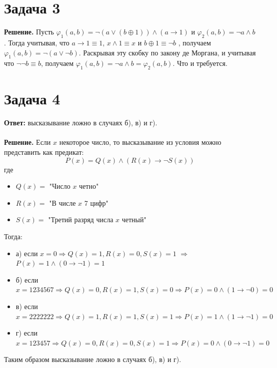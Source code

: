 \documentclass{article}
\begin{document}
\section*{Задача 3}
{\bf Решение.} Пусть $\varphi_1(a, b) = \neg (a\vee (b \oplus 1))\wedge (a \rightarrow 1)$ и $\varphi_2(a, b) = \neg a \wedge b$. Тогда учитывая, что $a \rightarrow 1 \equiv 1$,  $x \wedge 1 \equiv x$ и $b \oplus 
 1 \equiv \neg b$ , получаем $\varphi_1(a, b) = \neg (a\vee \neg b)$. Раскрывая эту скобку по закону де Моргана, и учитывая что $\neg \neg b \equiv b$, получаем $\varphi_1(a, b) =  \neg a \wedge b = \varphi_2(a, b)$. Что и требуется.
 \\
 \section*{Задача 4}
 {\bf Ответ:} высказывание ложно в случаях б), в) и г).
 \\
 \\
 {\bf Решение.} Если $x$ некоторое число, то высказывание из условия можно представить как предикат:
 $$P(x) = Q(x) \wedge ( R(x) \rightarrow \neg S(x) )$$
 где
 \begin{itemize}
     \item $Q(x) = $ "Число $x$ четно"
     \item $R(x)=$ "В числе $x$ 7 цифр"
     \item $S(x)=$ "Третий разряд числа $x$ четный"
 \end{itemize}
 Тогда:
 \begin{itemize}
 \item а) если $x = 0 \Rightarrow Q(x) = 1, R(x) = 0, S(x) = 1$  $\Rightarrow$ $P(x) = 1 \wedge (0\rightarrow\neg 1)=1$
 \item б) если $x=1234567\Rightarrow Q(x)=0,R(x)=1,S(x)=0\Rightarrow P(x)=0 \wedge (1\rightarrow\neg 0)=0$
 \item в) если $x=2222222\Rightarrow Q(x)=1,R(x)=1,S(x)=1\Rightarrow P(x)=1\wedge(1\rightarrow\neg 1)=0$
 \item г) если $x=123457\Rightarrow Q(x)=0,R(x)=0,S(x)=1\Rightarrow P(x)=0\wedge(0\rightarrow\neg 1)=0$
 \end{itemize}
 Таким образом высказывание ложно в случаях б), в) и г).
\end{document}
